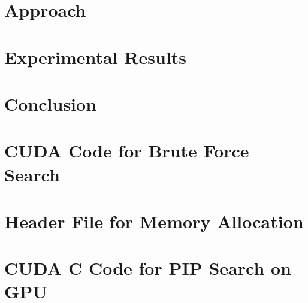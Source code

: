 \documentclass[11pt,letterpaper,]{thesis2}
\begin{document}
\chapter{Approach}\label{chap:approach}

\chapter{Experimental Results}\label{chap:results}

\chapter{Conclusion}\label{chap:conclusion}








\begin{appendix}
\chapter{CUDA Code for Brute Force Search} \label{appendix1}

\chapter{Header File for Memory Allocation} \label{appendix2}
\renewcommand{\theequation}{B.\arabic{equation}}

\chapter{CUDA C Code for PIP Search on GPU} \label{appendix3}
\renewcommand{\theequation}{B.\arabic{equation}}

\end{appendix}

%
\end{document}
